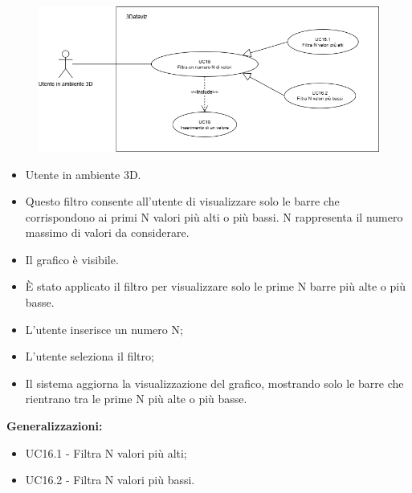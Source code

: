 \begin{figure}[h!]\centering
    \includegraphics[scale=0.6]{template/images/UC16.png}
    \caption{}
\end{figure}
\UCdsc
{ %
    \begin{itemize}
        \item Utente in ambiente 3D.
    \end{itemize}
}
{ %
    \begin{itemize}
        \item Questo filtro consente all'utente di visualizzare solo le barre che corrispondono ai primi N valori più alti o più bassi. 
        N rappresenta il numero massimo di valori da considerare.
    \end{itemize}
}
{ %
    \begin{itemize}
        \item Il grafico è visibile.
    \end{itemize}
}
{ %
    \begin{itemize}
        \item È stato applicato il filtro per visualizzare solo le prime N barre più alte o più basse.
    \end{itemize}
}
{ %
    \begin{itemize}
        \item L'utente inserisce un numero N;
        \item L'utente seleziona il filtro;
        \item Il sistema aggiorna la visualizzazione del grafico, mostrando solo le barre che rientrano tra le prime N più alte o più basse.
    \end{itemize}
        \item \textbf{Generalizzazioni:} \begin{itemize}
            \item UC16.1 - Filtra N valori più alti;
            \item UC16.2 - Filtra N valori più bassi.
        \end{itemize}
}


